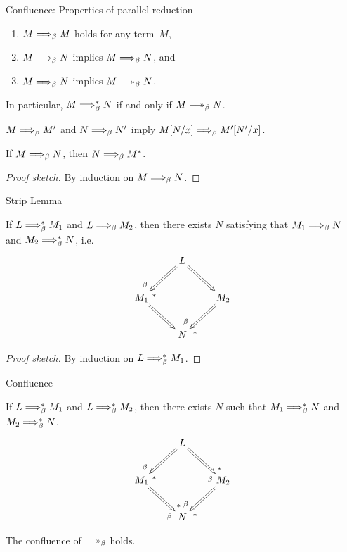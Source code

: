 \begin{frame}{Confluence: Properties of parallel reduction}
  \begin{lemma}
    \begin{enumerate}
      \item $M \Longrightarrow_{\beta} M$ holds for any term~$M$, 
      \item $M \longrightarrow_{\beta} N$ implies $M \Longrightarrow_{\beta} N$, and
      \item $M \Longrightarrow_{\beta} N$ implies $M \reduce N$.
    \end{enumerate}
    In particular, $M \Longrightarrow_{\beta}^* N$ if and only if $M \reduce N$. 
  \end{lemma}
  \begin{lemma}
      $M \Longrightarrow_{\beta} M'$ and $N \Longrightarrow_{\beta} N'$ imply $M[{N}/{x}] \Longrightarrow_{\beta}
      M'[{N'}/{x}]$. 
  \end{lemma}
  \begin{theorem}
    If $M \Longrightarrow_{\beta} N$, then $N \Longrightarrow_{\beta} M^*$.
  \end{theorem}
  \begin{proof}[Proof sketch]
    By induction on $M \Longrightarrow_{\beta} N$.
  \end{proof}
\end{frame}

\begin{frame}{Strip Lemma}
  \begin{theorem}
    If $L \Longrightarrow_{\beta}^* M_1$ and $L \Longrightarrow_{\beta} M_2$, then there exists $N$
    satisfying that $M_1 \Longrightarrow_{\beta} N$ and $M_2 \Longrightarrow_{\beta}^* N$, i.e.\
    \[
      \xymatrix{
        & L \ar@{=>}[rd] \ar@{=>}[ld]^(.8){*}_(.8){\beta} \\
        M_1 \ar@{=>}[rd] & & M_2 \ar@{=>}[ld]^(.8){*}_(.8){\beta} \\
            & N
      }
    \]
  \end{theorem}
  \begin{proof}[Proof sketch]
    By induction on $L \Longrightarrow_{\beta}^* M_1$. 
  \end{proof}
\end{frame}

\begin{frame}{Confluence}
  \begin{theorem}
    If $L \Longrightarrow_{\beta}^* M_1$ and $L \Longrightarrow_{\beta}^* M_2$, then there exists $N$ such that $M_1 \Longrightarrow_{\beta}^* N$ and $M_2 \Longrightarrow_{\beta}^* N$.
    \[
      \xymatrix{
        & L \ar@{=>}[rd]^(.8){*}_(.8){\beta} \ar@{=>}[ld]^(.8){*}_(.8){\beta} \\
        M_1 \ar@{=>}[rd]^(.8){*}_(.8){\beta} & & M_2 \ar@{=>}[ld]^(.8){*}_(.8){\beta} \\
            & N
      }
    \]
  \end{theorem}
  \begin{corollary}
    The confluence of $\reduce$ holds. 
  \end{corollary}
  
\end{frame}

%  
%   


